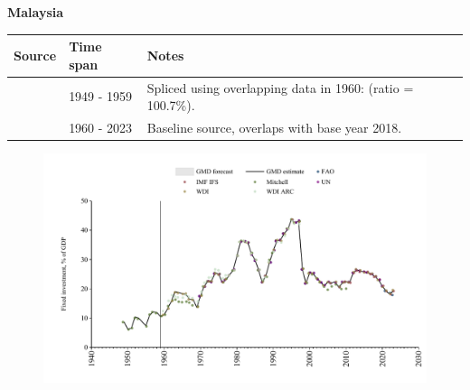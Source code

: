 \documentclass[12pt,a4paper,landscape]{article}
\begin{document}
\begin{adjustbox}{max totalsize={\paperwidth}{\paperheight},center}
\begin{minipage}[t][\textheight][t]{\textwidth}
\vspace*{0.5cm}
{}
\begin{center}
{\Large\bfseries Malaysia}
\end{center}
\vspace{0.5cm}
\begin{table}[H]
\centering
\small
\begin{tabular}{|l|l|l|}
\hline
\textbf{Source} & \textbf{Time span} & \textbf{Notes} \\
\hline
\rowcolor{white}\cite{Mitchell}& 1949 - 1959 &Spliced using overlapping data in 1960: (ratio = 100.7\%).\\
\rowcolor{lightgray}\cite{WDI}& 1960 - 2023 &Baseline source, overlaps with base year 2018.\\
\hline
\end{tabular}
\end{table}
\begin{figure}[H]
\centering
\includegraphics[width=\textwidth,height=0.6\textheight,keepaspectratio]{graphs/MYS_finv_GDP.pdf}
\end{figure}
\end{minipage}
\end{adjustbox}
\end{document}
